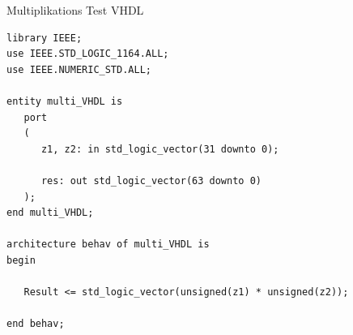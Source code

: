Multiplikations Test VHDL
\begin{verbatim}
library IEEE;
use IEEE.STD_LOGIC_1164.ALL;
use IEEE.NUMERIC_STD.ALL;

entity multi_VHDL is
   port
   (
      z1, z2: in std_logic_vector(31 downto 0);

      res: out std_logic_vector(63 downto 0)
   );
end multi_VHDL;

architecture behav of multi_VHDL is
begin

   Result <= std_logic_vector(unsigned(z1) * unsigned(z2));

end behav;
\end{verbatim}